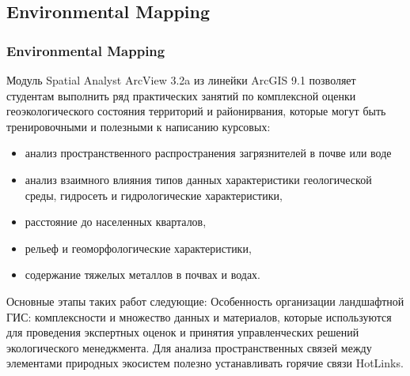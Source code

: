 \documentclass[pdflatex,compress,8pt,
	xcolor={dvipsnames,dvipsnames,svgnames,x11names,table},
	hyperref={	 
	pdfauthor={Lemenkova Polina}, 
	pdfsubject={Preentation}, 
	pdfcreator={Lemenkova Polina}, 
	pdfproducer={Lemenkova Polina}, 
	colorlinks=true,
	linkcolor=Red3, 
	citecolor=NavyBlue, 
	urlcolor = NavyBlue, 
	breaklinks = true}]{beamer}
\begin{document}
\subsection{Environmental Mapping}
\begin{frame}\frametitle{Environmental Mapping}

\begin{alertblock}{}
Модуль Spatial Analyst ArcView 3.2a из линейки ArcGIS 9.1 позволяет студентам выполнить ряд практических занятий по комплексной оценки геоэкологического состояния территорий и районирвания, которые могут быть тренировочными и полезными к написанию курсовых:
\begin{itemize}
	\item анализ пространственного распространения загрязнителей в почве или воде 
	\item анализ взаимного влияния типов данных характеристики геологической среды, гидросеть и гидрологические характеристики, 
	\item расстояние до населенных кварталов, 
	\item рельеф и геоморфологические характеристики,
	\item содержание тяжелых металлов в почвах и водах.
\end{itemize}
\end{alertblock}

\begin{block}{}
Основные этапы таких работ следующие: Особенность организации ландшафтной ГИС: комплексности и множество данных и материалов, которые используются для проведения экспертных оценок и принятия управленческих решений экологического менеджмента. Для анализа пространственных связей между элементами природных экосистем полезно устанавливать горячие связи HotLinks.
\end{block}

\end{frame}
\end{document}
